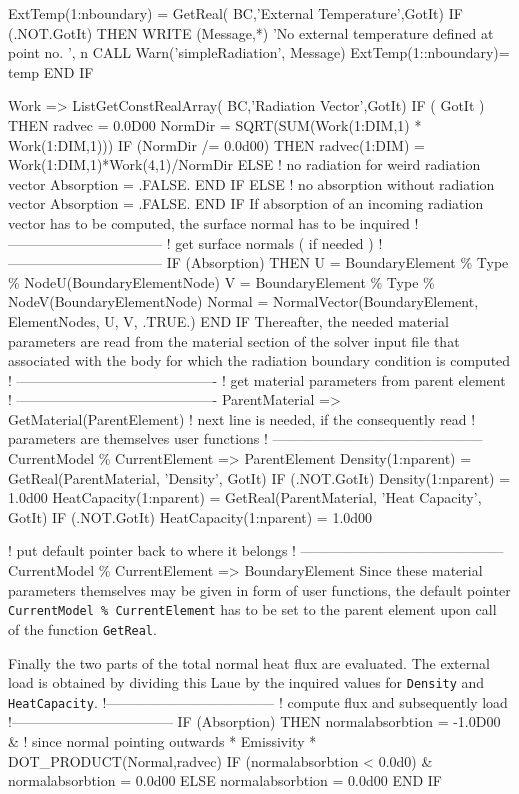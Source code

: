   ExtTemp(1:nboundary) = GetReal( BC,'External Temperature',GotIt)
  IF (.NOT.GotIt) THEN
     WRITE (Message,*) 'No external temperature defined at point no. ', n 
     CALL Warn('simpleRadiation', Message)
     ExtTemp(1::nboundary)= temp
  END IF
  
  Work => ListGetConstRealArray( BC,'Radiation Vector',GotIt)
  IF ( GotIt ) THEN
     radvec = 0.0D00
     NormDir =  SQRT(SUM(Work(1:DIM,1) * Work(1:DIM,1)))
     IF (NormDir /= 0.0d00) THEN
        radvec(1:DIM) = Work(1:DIM,1)*Work(4,1)/NormDir
     ELSE ! no radiation for weird radiation vector
        Absorption = .FALSE.
     END IF
  ELSE ! no absorption without radiation vector
     Absorption = .FALSE.
  END IF
\ttend
If absorption of an incoming radiation vector has to be computed, the surface normal has to be inquired
\ttbegin
! ---------------------------------
! get surface normals ( if needed )
! ---------------------------------
  IF (Absorption) THEN
     U = BoundaryElement \% Type \% NodeU(BoundaryElementNode)
     V = BoundaryElement \% Type \% NodeV(BoundaryElementNode)
     Normal = NormalVector(BoundaryElement, ElementNodes, U, V, .TRUE.)
  END IF
\ttend
Thereafter, the needed material parameters are read from the material section of the solver input file that associated with the body for which the radiation boundary condition is computed
\ttbegin
! -------------------------------------------
! get material parameters from parent element
! -------------------------------------------
  ParentMaterial => GetMaterial(ParentElement)
  ! next line is needed, if the consequently read 
  ! parameters are themselves user functions
  ! ---------------------------------------------
  CurrentModel \% CurrentElement => ParentElement
  Density(1:nparent) = GetReal(ParentMaterial, 'Density', GotIt)
  IF (.NOT.GotIt) Density(1:nparent) = 1.0d00
  HeatCapacity(1:nparent) = GetReal(ParentMaterial, 'Heat Capacity', GotIt)
  IF (.NOT.GotIt) HeatCapacity(1:nparent) = 1.0d00

  ! put default pointer back to where it belongs
  ! --------------------------------------------
  CurrentModel \% CurrentElement => BoundaryElement
\ttend
Since these material parameters themselves may be given in form of user functions, the default pointer \texttt{CurrentModel \% CurrentElement} has to be set to the parent element upon call of the function \texttt{GetReal}. 

Finally the two parts of the total normal heat flux are evaluated. The external load is obtained by dividing this Laue by the inquired values for \texttt{Density} and \texttt{HeatCapacity}.
\ttbegin
!------------------------------------
! compute flux and subsequently load
!-----------------------------------
  IF (Absorption) THEN
     normalabsorbtion = -1.0D00 & ! since normal pointing outwards
          * Emissivity * DOT_PRODUCT(Normal,radvec) 
     IF (normalabsorbtion < 0.0d0) &
          normalabsorbtion = 0.0d00
  ELSE
     normalabsorbtion = 0.0d00
  END IF

